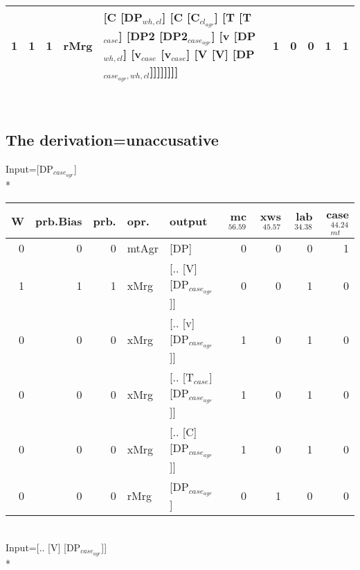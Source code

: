 \begin{tabularx}{\linewidth}{rrrlXrrrrr}
   1 &       1 &   1 & rMrg & [C [DP$_{wh,cl}$] [C [C$_{cl_{agr}}$] [T [T$_{case}$] [DP2 [DP2$_{case_{agr}}$] [v [DP$_{wh,cl}$] [v$_{case}$ [v$_{case}$] [V [V] [DP$_{case_{agr},wh,cl}$]]]]]]]]                                                                                                     &             1 &             0 &                  0 &           1 &           1 \\
\hline
\end{tabularx}\endgroup\\
\subsection{The derivation=unaccusative}
\begingroup\scriptsize Input=[DP$_{case_{agr}}$]\\*
\begin{tabularx}{\linewidth}{rrrlXrrrr}
\hline
   W &   prb.Bias &   prb. & opr.    & output                      &   mc$^{56.59}$ &   xws$^{45.57}$ &   lab$^{34.38}$ &   case$_{mt}^{44.24}$ \\
\hline
   0 &       0 &   0 & mtAgr & [DP]                        &            0 &             0 &             0 &                 1 \\
   1 &       1 &   1 & xMrg  & [.. [V] [DP$_{case_{agr}}$]]      &            0 &             0 &             1 &                 0 \\
   0 &       0 &   0 & xMrg  & [.. [v] [DP$_{case_{agr}}$]]      &            1 &             0 &             1 &                 0 \\
   0 &       0 &   0 & xMrg  & [.. [T$_{case}$] [DP$_{case_{agr}}$]] &            1 &             0 &             1 &                 0 \\
   0 &       0 &   0 & xMrg  & [.. [C] [DP$_{case_{agr}}$]]      &            1 &             0 &             1 &                 0 \\
   0 &       0 &   0 & rMrg  & [DP$_{case_{agr}}$]               &            0 &             1 &             0 &                 0 \\
\hline
\end{tabularx}\endgroup\\
\begingroup\scriptsize Input=[.. [V] [DP$_{case_{agr}}$]]\\*
